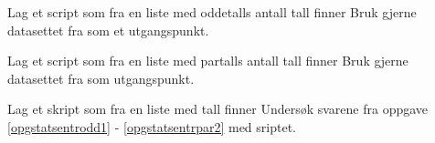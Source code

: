 



Lag et script som fra en liste med oddetalls antall tall finner
Bruk gjerne datasettet fra  som et utgangspunkt.

Lag et script som fra en liste med partalls antall tall finner
Bruk gjerne datasettet fra  som utgangspunkt.

\newpage
{}
Lag et skript som fra en liste med tall finner
Undersøk svarene fra {\color{blue}oppgave \ref{opgstatsentrodd1} - \ref{opgstatsentrpar2}} med sriptet.




